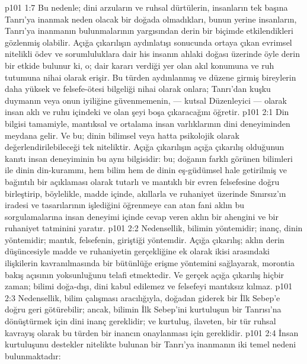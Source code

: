\vs p101 1:7 Bu nedenle; dini arzuların ve ruhsal dürtülerin, insanların tek başına Tanrı’ya inanmak  neden olacak bir doğada olmadıkları, bunun yerine insanların, Tanrı’ya inanmanın bulunmalarının yargısından derin bir biçimde etkilendikleri gözlenmiş olabilir. Açığa çıkarılışın aydınlatışı sonucunda ortaya çıkan evrimsel nitelikli ödev ve sorumluluklara dair his insanın ahlaki doğası üzerinde öyle derin bir etkide bulunur ki, o;  dair kararı verdiği yer olan akıl konumuna ve ruh tutumuna nihai olarak erişir. Bu türden aydınlanmış ve düzene girmiş bireylerin daha yüksek ve felsefe\hyp{}ötesi bilgeliği nihai olarak onlara; Tanrı’dan kuşku duymanın veya onun iyiliğine güvenmemenin, --- kutsal Düzenleyici --- olarak insan aklı ve ruhu içindeki  ve  olan şeyi boşa çıkaracağını öğretir.
\vs p101 2:1 Din bilgisi tamamiyle, mantıksal ve ortalama insan varlıklarının dini deneyiminden meydana gelir. Ve bu; dinin bilimsel veya hatta psikolojik olarak değerlendirilebileceği tek niteliktir. Açığa çıkarılışın açığa çıkarılış olduğunun kanıtı insan deneyiminin bu aynı bilgisidir: bu; doğanın farklı görünen bilimleri ile dinin din\hyp{}kuramını, hem bilim hem de dinin eş\hyp{}güdümsel hale getirilmiş ve bağıntılı bir açıklaması olarak tutarlı ve mantıklı bir evren felsefesine doğru birleştirip, böylelikle, madde içinde, akıllarla ve ruhaniyet üzerinde Sınırsız’ın iradesi ve tasarılarının  işlediğini öğrenmeye can atan fani aklın bu sorgulamalarına insan deneyimi içinde cevap veren aklın bir ahengini ve bir ruhaniyet tatminini yaratır.
\vs p101 2:2 Nedensellik, bilimin yöntemidir; inanç, dinin yöntemidir; mantık, felsefenin, giriştiği yöntemdir. Açığa çıkarılış; aklın derin düşüncesiyle madde ve ruhaniyetin gerçekliğine ek olarak ikisi arasındaki ilişkilerin kavranılmasında bir bütünlüğe erişme yöntemini sağlayarak, morontia bakış açısının yoksunluğunu telafi etmektedir. Ve gerçek açığa çıkarılış hiçbir zaman; bilimi doğa\hyp{}dışı, dini kabul edilemez ve felsefeyi mantıksız kılmaz.
\vs p101 2:3 Nedensellik, bilim çalışması aracılığıyla, doğadan giderek bir İlk Sebep’e doğru geri götürebilir; ancak, bilimin İlk Sebep’ini kurtuluşun bir Tanrısı’na dönüştürmek için dini inanç gereklidir; ve kurtuluş, ilaveten, bir tür ruhsal kavrayış olarak bu türden bir inancın onaylanması için gereklidir.
\vs p101 2:4 İnsan kurtuluşunu destekler nitelikte bulunan bir Tanrı’ya inanmanın iki temel nedeni bulunmaktadır:
